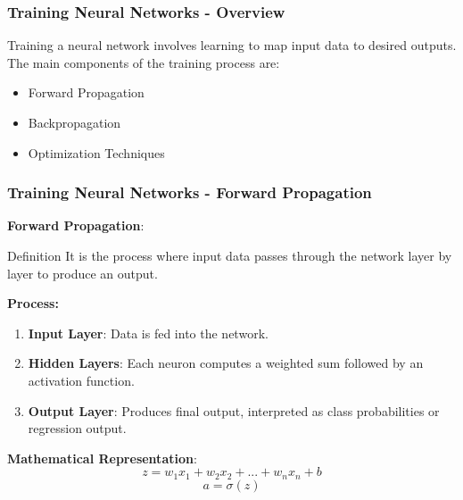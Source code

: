 \documentclass[aspectratio=169]{beamer}
\begin{document}
\begin{frame}[fragile]
  \frametitle{Training Neural Networks - Overview}
  Training a neural network involves learning to map input data to desired outputs. The main components of the training process are:
  \begin{itemize}
      \item Forward Propagation
      \item Backpropagation
      \item Optimization Techniques
  \end{itemize}
\end{frame}

\begin{frame}[fragile]
  \frametitle{Training Neural Networks - Forward Propagation}
  \textbf{Forward Propagation}:
  
  \begin{block}{Definition}
      It is the process where input data passes through the network layer by layer to produce an output.
  \end{block}
  
  \textbf{Process:}
  \begin{enumerate}
      \item \textbf{Input Layer}: Data is fed into the network.
      \item \textbf{Hidden Layers}: Each neuron computes a weighted sum followed by an activation function.
      \item \textbf{Output Layer}: Produces final output, interpreted as class probabilities or regression output.
  \end{enumerate}
  
  \textbf{Mathematical Representation}:
  \begin{equation}
      z = w_1x_1 + w_2x_2 + ... + w_nx_n + b
  \end{equation}
  \begin{equation}
      a = \sigma(z)
  \end{equation}
\end{frame}
\end{document}
